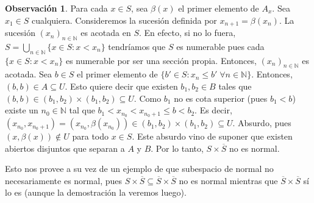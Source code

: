 \documentclass[12pt]{book}
\theoremstyle{definition}
\newtheorem{obs}[teo]{Observación}
\newcommand{\NN}{\mathbb{N}}
\begin{document}
\begin{obs}
Para cada $x\in S$, sea $\beta(x)$ el primer elemento de $A_x$. Sea $x_1\in S$ cualquiera. Consideremos la sucesión definida por $x_{n+1}=\beta(x_n)$. La sucesión $(x_n)_{n\in\NN}$ es acotada en $S$. En efecto, si no lo fuera, $S = \displaystyle\bigcup_{n\in\NN} \{x\in S : x< x_n\}$ tendríamos que $S$ es numerable pues cada $\{x\in S : x< x_n\}$ es numerable por ser una sección propia. Entonces, $(x_n)_{n\in\NN}$ es acotada. Sea $b\in S$ el primer elemento de $\{b'\in S : x_n \leq b' \;\forall n\in\NN\}$. Entonces, $(b,b)\in A\subseteq U$. Esto quiere decir que existen $b_1,b_2\in B$ tales que $(b,b)\in (b_1,b_2)\times (b_1,b_2)\subseteq U$. Como $b_1$ no es cota superior (pues $b_1<b$) existe un $n_0\in\NN$ tal que $b_1< x_{n_0}<x_{n_0+1}\leq b<b_2$. Es decir, $(x_{n_0},x_{n_0+1}) = (x_{n_0},\beta(x_{n_0})) \in (b_1,b_2)\times(b_1,b_2)\subseteq U$. Absurdo, pues $(x,\beta(x))\notin U$ para todo $x\in S$. Este absurdo vino de suponer que existen abiertos disjuntos que separan a $A$ y $B$. Por lo tanto, $S\times\overline{S}$ no es normal.

Esto nos provee a su vez de un ejemplo de que subespacio de normal no necesariamente es normal, pues $S\times\overline{S}\subseteq \overline{S}\times\overline{S}$ no es normal mientras que $\overline{S}\times\overline{S}$ sí lo es (aunque la demostración la veremos luego).

\end{obs}
\end{document}
